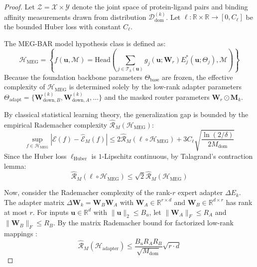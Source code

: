 \documentclass{article}
\theoremstyle{definition}
\begin{document}
\begin{proof}
Let $\mathcal{Z} = \mathcal{X} \times \mathcal{Y}$ denote the joint space of protein-ligand pairs and binding affinity measurements drawn from distribution $\mathcal{D}_{\text{dom}}^{(k)}$. Let $\ell: \mathbb{R} \times \mathbb{R} \to [0, C_{\ell}]$ be the bounded Huber loss with constant $C_{\ell}$. 

The MEG-BAR model hypothesis class is defined as:
\begin{equation}
\mathcal{H}_{\text{MEG}} = \left\{ f(\mathbf{u}, \mathcal{M}) = \text{Head}\left( \sum_{j \in \mathcal{T}_k(\mathbf{u})} g_j(\mathbf{u}; \mathbf{W}_r) E_j^*(\mathbf{u}; \Theta_j), \mathcal{M} \right) \right\}
\end{equation}
Because the foundation backbone parameters $\Theta_{\text{base}}$ are frozen, the effective complexity of $\mathcal{H}_{\text{MEG}}$ is determined solely by the low-rank adapter parameters $\Theta_{\text{adapt}} = \{\mathbf{W}_{\text{down}, B}^{(k)}, \mathbf{W}_{\text{down}, A}^{(k)}, \dots\}$ and the masked router parameters $\mathbf{W}_r \odot \mathbf{M}_k$.

By classical statistical learning theory, the generalization gap is bounded by the empirical Rademacher complexity $\hat{\mathcal{R}}_M(\mathcal{H}_{\text{MEG}})$:
\begin{equation}
\sup_{f \in \mathcal{H}_{\text{MEG}}} | \mathcal{E}(f) - \hat{\mathcal{E}}_M(f) | \le 2 \hat{\mathcal{R}}_M(\ell \circ \mathcal{H}_{\text{MEG}}) + 3 C_{\ell} \sqrt{\frac{\ln(2/\delta)}{2 M_{\text{dom}}}}
\label{eq:rademacher_bound}
\end{equation}
Since the Huber loss $\ell_{\text{Huber}}$ is $1$-Lipschitz continuous, by Talagrand's contraction lemma:
\begin{equation}
\hat{\mathcal{R}}_M(\ell \circ \mathcal{H}_{\text{MEG}}) \le \sqrt{2} \hat{\mathcal{R}}_M(\mathcal{H}_{\text{MEG}})
\end{equation}

Now, consider the Rademacher complexity of the rank-$r$ expert adapter $\Delta E_k$. The adapter matrix $\Delta \mathbf{W}_k = \mathbf{W}_B \mathbf{W}_A$ with $\mathbf{W}_A \in \mathbb{R}^{r \times d}$ and $\mathbf{W}_B \in \mathbb{R}^{d \times r}$ has rank at most $r$. For inputs $\mathbf{u} \in \mathbb{R}^d$ with $\|\mathbf{u}\|_2 \le B_u$, let $\|\mathbf{W}_A\|_F \le R_A$ and $\|\mathbf{W}_B\|_F \le R_B$. By the matrix Rademacher bound for factorized low-rank mappings \citep{kakade2008duality}:
\begin{equation}
\hat{\mathcal{R}}_M(\mathcal{H}_{\text{adapter}}) \le \frac{B_u R_A R_B}{\sqrt{M_{\text{dom}}}} \sqrt{r \cdot d}
\end{equation}


\end{proof}
\end{document}
